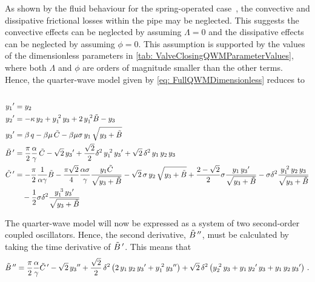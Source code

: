 As shown by the fluid behaviour for the spring-operated case~\cite{Hos2015ModelPipe}, the convective and dissipative frictional losses within the pipe may be neglected. This suggests the convective effects can be neglected by assuming $\Lambda = 0$ and the dissipative effects can be neglected by assuming $\phi = 0$. This assumption is supported by the values of the dimensionless parameters in \cref{tab: ValveClosingQWMParameterValues}, where both $\Lambda$ and $\phi$ are orders of magnitude smaller than the other terms. Hence, the quarter-wave model given by \cref{eq: FullQWMDimensionless} reduces to
~
\begin{equation}
\begin{split}
    \dash{y_1} &= y_2 \\
    \dash{y_2} &= - \kappa \, y_2 + y_1\power{2} \, y_3 + 2 \, y_1\power{2} \tilde{B} - y_3 \\
    \dash{y_3} &= \beta \, q - \beta \mu \, \tilde{C} - \beta \mu \sigma \, y_1 \, \sqrt{y_3 + \tilde{B}} \\
    \dash{\tilde{B}\,} &= \frac{\pi}{2} \frac{\alpha}{\gamma} \, \tilde{C} - \sqrt{2} \, \dash{y_3} + \frac{\sqrt{2}}{2} \delta^2 \, y_1\power{2} \, \dash{y_3} + \sqrt{2} \, \delta^2 \, y_1 \, y_2 \, y_3 \\
    \dash{\tilde{C}\,} &=
    - \frac{\pi}{2} \frac{1}{\alpha \gamma} \tilde{B}
    - \frac{\pi \sqrt{2}}{4} \frac{\alpha \sigma}{\gamma} \frac{y_1 \tilde{C}}{\sqrt{y_3 + \tilde{B}}}
    - \sqrt{2} \, \sigma \, y_2 \, \sqrt{y_3 + \tilde{B}}
    + \frac{2-\sqrt{2}}{2} \sigma \frac{y_1 \, \dash{y_3}}{\sqrt{y_3 + \tilde{B}}}
    - \sigma \delta^2 \frac{y_1\power{2} \, y_2 \, y_3}{\sqrt{y_3 + \tilde{B}}}
    \\ & \quad %
    - \frac{1}{2} \sigma \delta^2 \frac{y_1\power{3} \, \dash{y_3}}{\sqrt{y_3 + \tilde{B}}} 
\end{split}
\end{equation}

The quarter-wave model will now be expressed as a system of two second-order coupled oscillators. Hence, the second derivative, $\tilde{B}\,{''}$, must be calculated by taking the time derivative of $\tilde{B}\,{'}$. This means that
~
\begin{equation*}
    \tilde{B}\,{''} = \frac{\pi}{2} \frac{\alpha}{\gamma} \tilde{C}\,{'} - \sqrt{2} \, y_3{''} + \frac{\sqrt{2}}{2} \, \delta^2 \left( 2 \, y_1 \, y_2 \, y_3{'} + y_1^{\;2} \, y_3{''} \right) + \sqrt{2} \, \delta^2 \left( y_2^{\;2} \, y_3 + y_1 \, y_2{'} \, y_3 + y_1 \, y_2 \, y_3{'} \right) \, .
\end{equation*}

